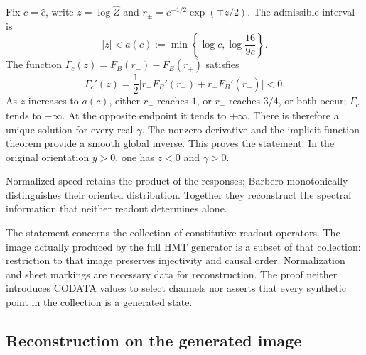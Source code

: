 Fix $c=\widehat c$, write $z=\log\widehat Z$ and
$r_\pm=c^{-1/2}\exp(\mp z/2)$. The admissible interval is
\begin{equation}
 |z|<a(c):=\min\left\{\log c,\log\frac{16}{9c}\right\}.
 \label{md:compos:dominio-z}
\end{equation}
The function $\Gamma_c(z)=F_B(r_-)-F_B(r_+)$ satisfies
\begin{equation}
 \Gamma_c'(z)=\frac12
 \bigl[r_-F_B'(r_-)+r_+F_B'(r_+)\bigr]<0.
 \label{md:compos:derivada-gamma}
\end{equation}
As $z$ increases to $a(c)$, either $r_-$ reaches $1$, or $r_+$ reaches $3/4$,
or both occur; $\Gamma_c$ tends to $-\infty$. At the opposite endpoint it
tends to $+\infty$. There is therefore a unique solution for every real
$\gamma$. The nonzero derivative and the implicit function theorem provide
a smooth global inverse. This proves the statement. In the original
orientation $y>0$, one has $z<0$ and $\gamma>0$.

Normalized speed retains the product of the responses; Barbero
monotonically distinguishes their oriented distribution. Together they
reconstruct the spectral information that neither readout determines alone.

The statement concerns the collection of constitutive readout operators. The image
actually produced by the full HMT generator is a subset of that collection:
restriction to that image preserves injectivity and causal order.
Normalization and sheet markings are necessary data for reconstruction.
The proof neither introduces CODATA values to select channels nor asserts
that every synthetic point in the collection is a generated state.

\subsection{Reconstruction on the generated image}
\label{md:compos:restitucion-completa}

